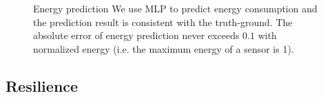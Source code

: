 \begin{figure}[!h]
	\centering
	\hspace{-0.3cm}
	\hspace{-0.2cm}
	\vspace{-0.1in}
	\caption{Energy prediction
		\textnormal{
			We use MLP to predict energy consumption and the
			prediction result is consistent with the truth-ground.  The absolute
			error of energy prediction never exceeds $0.1$ with normalized energy
			(i.e. the maximum energy of a sensor is 1).
		}
	}
	\label{fig:energy_pred}
\end{figure}

\subsection{Resilience}

